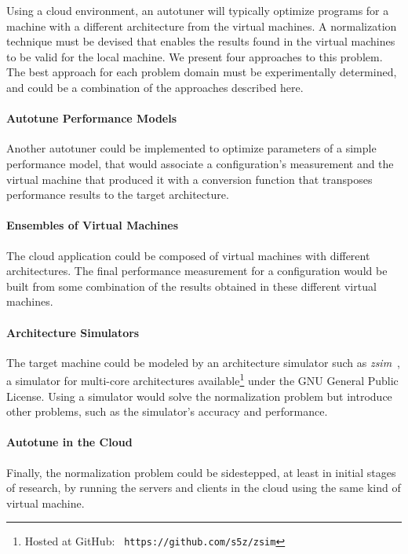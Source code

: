 \documentclass[12pt]{article}
\begin{document}

Using a cloud environment, an autotuner will typically optimize programs for
a machine with a different architecture from the virtual machines. A
normalization technique must be devised that enables the results found in the
virtual machines to be valid for the local machine.  We present four
approaches to this problem. The best approach for each problem domain
must be experimentally determined, and could be a combination of the approaches
described here.

\paragraph{Autotune Performance Models}
Another autotuner could be implemented to optimize parameters of a simple
performance model, that would associate a configuration's measurement and the
virtual machine that produced it with a conversion function that transposes
performance results to the target architecture.

\paragraph{Ensembles of Virtual Machines}
The cloud application could be composed of virtual machines with different
architectures. The final performance measurement for a configuration would be
built from some combination of the results obtained in these different virtual
machines.

\paragraph{Architecture Simulators}
The target machine could be modeled by an architecture simulator such as
\emph{zsim}~\cite{sanchez2013zsim}, a simulator for multi-core architectures
available\footnote{Hosted at GitHub: \texttt{\scriptsize
https://github.com/s5z/zsim}} under the GNU General Public License.  Using a
simulator would solve the normalization problem but introduce other problems,
such as the simulator's accuracy and performance.

\paragraph{Autotune in the Cloud}
Finally, the normalization problem could be sidestepped, at least in initial
stages of research, by running the servers and clients in the cloud using
the same kind of virtual machine.
\end{document}
